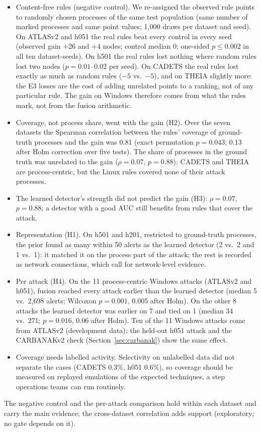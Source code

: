 \documentclass[acmlarge,screen,review]{acmart}
\begin{document}
\begin{itemize}
\item Content-free rules (negative control). We re-assigned the observed rule points to randomly chosen
processes of the same test population (same number of marked processes and same point values; 1{,}000 draws per
dataset and seed). On ATLASv2 and h051 the real rules beat every control in every seed (observed gain $+26$ and $+4$
nodes; control median 0; one-sided $p\le0.002$ in all ten dataset-seeds). On h501 the real rules lost nothing where
random rules lost two nodes ($p=0.01$--$0.02$ per seed). On CADETS the real rules lost exactly as much as random
rules ($-5$ vs.\ $-5$), and on THEIA slightly more: the E3 losses are the cost of adding unrelated points to a ranking,
not of any particular rule. The gain on Windows therefore comes from what the rules mark, not from the fusion
arithmetic.
\item Coverage, not process share, went with the gain (H2). Over the seven datasets the Spearman correlation
between the rules' coverage of ground-truth processes and the gain was 0.81 (exact permutation $p=0.043$; 0.13 after
Holm correction over five tests). The share of processes in the ground truth was unrelated to the gain
($\rho=0.07$, $p=0.88$): CADETS and THEIA are process-centric, but the Linux rules covered none of their attack
processes.
\item The learned detector's strength did not predict the gain (H3): $\rho=0.07$, $p=0.88$; a detector with a good
AUC still benefits from rules that cover the attack.
\item Representation (H1). On h501 and h201, restricted to ground-truth processes, the prior found as many
within 50 alerts as the learned detector (2 vs.\ 2 and 1 vs.\ 1): it matched it on the process part of the
attack; the rest is recorded as network connections, which call for network-level evidence.
\item Per attack (H4). On the 11 process-centric Windows attacks (ATLASv2 and h051), fusion reached every attack
earlier than the learned detector (median 5 vs.\ 2{,}698 alerts; Wilcoxon $p=0.001$, 0.005 after Holm). On the other 8
attacks the learned detector was earlier on 7 and tied on 1 (median 34 vs.\ 271; $p=0.016$, 0.06 after Holm). Ten of
the 11 Windows attacks come from ATLASv2 (development data); the held-out h051 attack and the CARBANAKv2 check
(Section~\ref{sec:carbanak}) show the same effect.
\item Coverage needs labelled activity. Selectivity on unlabelled data did not separate the cases (CADETS 0.3\%,
h051 0.6\%), so coverage should be measured on replayed emulations of the expected techniques, a step operations
teams can run routinely.
\end{itemize}
The negative control and the per-attack comparison hold within each dataset and carry the main evidence; the
cross-dataset correlation adds support (exploratory; no gate depends on it).
\end{document}
